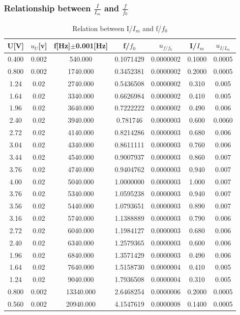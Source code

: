 \documentclass[12pt,a4paper]{article}
\begin{document}
\subsubsection{Relationship between $\frac{I}{I_m}$ and $\frac{f}{f_0}$}
\begin{table}[H]
    \centering
    \begin{tabular}{|c|c|c|c|c|c|c|}
    \hline
    U[V]     & $u_U$[v]    & f[Hz]$\pm$0.001[Hz]         & f/$f_0$      & $u_{f/f_0}$     & I/$I_m$   & $u_{I/I_m}$  \\ \hline
    0.400 & 0.002 & 540.000   & 0.1071429 & 0.0000002 & 0.1000 & 0.0005 \\ \hline
    0.800 & 0.002 & 1740.000  & 0.3452381  & 0.0000002  & 0.2000 & 0.0005 \\ \hline
    1.24  & 0.02  & 2740.000  & 0.5436508  & 0.0000002  & 0.310  & 0.005  \\ \hline
    1.64  & 0.02  & 3340.000  & 0.6626984  & 0.0000002  & 0.410  & 0.005  \\ \hline
    1.96  & 0.02  & 3640.000  & 0.7222222  & 0.0000002  & 0.490  & 0.006  \\ \hline
    2.40  & 0.02  & 3940.000  & 0.781746  & 0.0000003  & 0.600  & 0.0060  \\ \hline
    2.72  & 0.02  & 4140.000  & 0.8214286  & 0.0000003  & 0.680  & 0.006  \\ \hline
    3.04  & 0.02  & 4340.000  & 0.8611111  & 0.0000003  & 0.760  & 0.006  \\ \hline
    3.44  & 0.02  & 4540.000  & 0.9007937  & 0.0000003  & 0.860  & 0.007  \\ \hline
    3.76  & 0.02  & 4740.000  & 0.9404762  & 0.0000003  & 0.940  & 0.007  \\ \hline
    4.00  & 0.02  & 5040.000  & 1.0000000  & 0.0000003  & 1.000  & 0.007  \\ \hline
    3.76  & 0.02  & 5340.000  & 1.0595238  & 0.0000003  & 0.940  & 0.007  \\ \hline
    3.56  & 0.02  & 5440.000  & 1.0793651  & 0.0000003  & 0.890  & 0.007  \\ \hline
    3.16  & 0.02  & 5740.000  & 1.1388889  & 0.0000003  & 0.790  & 0.006  \\ \hline
    2.72  & 0.02  & 6040.000  & 1.1984127  & 0.0000003  & 0.680  & 0.006  \\ \hline
    2.40  & 0.02  & 6340.000  & 1.2579365  & 0.0000003  & 0.600  & 0.006  \\ \hline
    1.96  & 0.02  & 6840.000  & 1.3571429  & 0.0000003  & 0.490  & 0.006  \\ \hline
    1.64  & 0.02  & 7640.000  & 1.5158730  & 0.0000004  & 0.410  & 0.005  \\ \hline
    1.24  & 0.02  & 9040.000  & 1.7936508  & 0.0000004  & 0.310  & 0.005  \\ \hline
    0.800 & 0.002 & 13340.000 & 2.6468254  & 0.0000006  & 0.2000 & 0.0005 \\ \hline
    0.560 & 0.002 & 20940.000 & 4.1547619   & 0.0000008   & 0.1400 & 0.0005 \\ \hline
    \end{tabular}
    \caption{Relation between I/$I_m$ and f/$f_0$}
\end{table}
\end{document}

